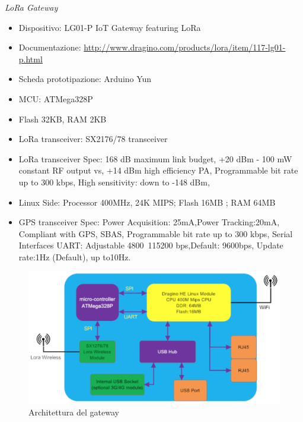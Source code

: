 \documentclass[12pt,a4paper,openright,twoside]{report}
\begin{document}
\textit{LoRa Gateway}
\begin{itemize}
    \item Dispositivo: LG01-P IoT Gateway featuring LoRa
    \item Documentazione: \url{http://www.dragino.com/products/lora/item/117-lg01-p.html}
    \item Scheda prototipazione: Arduino Yun
    \item MCU: ATMega328P
    \item Flash 32KB, RAM 2KB
    \item LoRa transceiver: SX2176/78 transceiver
    \item LoRa transceiver Spec: 168 dB maximum link budget, +20 dBm - 100 mW constant RF output vs, +14 dBm high efficiency PA, Programmable bit rate up to 300 kbps, High sensitivity: down to -148 dBm, 
    \item Linux Side: Processor 400MHz, 24K MIPS; Flash 16MB ; RAM 64MB
    \item GPS transceiver Spec: Power Acquisition: 25mA,Power Tracking:20mA, Compliant with GPS, SBAS, Programmable bit rate up to 300 kbps, Serial Interfaces UART: Adjustable 4800~115200 bps,Default: 9600bps, Update rate:1Hz (Default), up to10Hz.
\end{itemize}



\begin{figure}[h]                      
\begin{center} 
\includegraphics[width=\textwidth]{LoRa_Gateway_Spec.png}
\caption[Architettura del gateway]{Architettura del gateway}\label{fig:prima}
\end{center}
\end{figure}
\end{document}
